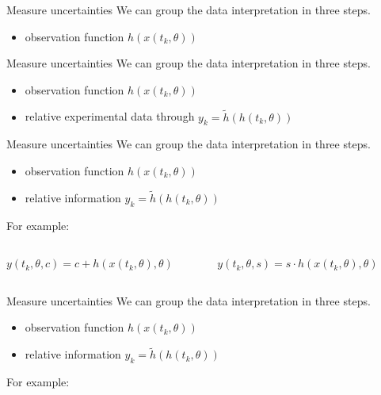 \documentclass{beamer}
\begin{document}
  	\begin{frame}{Measure uncertainties}
    	We can group the data interpretation in three steps.
  		\begin{itemize}
   			\item observation function $h(x(t_k,\theta))$
    	\end{itemize}
  	\end{frame}
  	
  	\begin{frame}{Measure uncertainties}
    	We can group the data interpretation in three steps.
    	\begin{itemize}
    		\item observation function $h(x(t_k,\theta))$
    		\item relative experimental data through $y_k = \tilde{h}
    		(h(t_k, \theta))$
    	\end{itemize}
  	\end{frame}
  	
  	\begin{frame}{Measure uncertainties}
    	We can group the data interpretation in three steps.
    	\begin{itemize}
    		\item observation function $h(x(t_k,\theta))$
    		\item relative information $y_k = \tilde{h}
    		(h(t_k, \theta))$
    	\end{itemize}
    	For example:
    	\vspace{0.7cm}
    	\begin{columns}
  			\begin{column}{5cm}
  				$y(t_k,\theta,c) = c + h(x(t_k,\theta),\theta)$
  			\end{column}
  			\begin{column}{5cm}
 				$y(t_k,\theta,s) = s \cdot h(x(t_k,\theta),\theta)$
  			\end{column}
  		\end{columns}
  	\end{frame}
  	
  	\begin{frame}{Measure uncertainties}
    	We can group the data interpretation in three steps.
    	\begin{itemize}
    		\item observation function $h(x(t_k,\theta))$
    		\item relative information $y_k = \tilde{h}
    		(h(t_k, \theta))$
    	\end{itemize}
    	For example:
    	\vspace{0.7cm}
  	\end{frame}  	
  	
\end{document}
